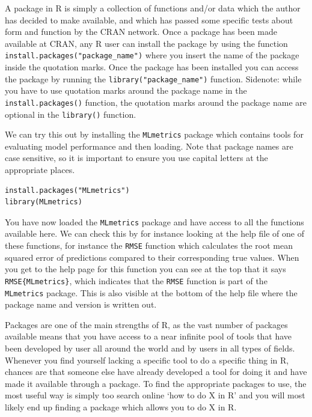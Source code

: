 \documentclass[
]{book}
\begin{document}
A package in R is simply a collection of functions and/or data which the author has decided to make available, and which has passed some specific tests about form and function by the CRAN network. Once a package has been made available at CRAN, any R user can install the package by using the function \texttt{install.packages("package\_name")} where you insert the name of the package inside the quotation marks. Once the package has been installed you can access the package by running the \texttt{library("package\_name")} function. Sidenote: while you have to use quotation marks around the package name in the \texttt{install.packages()} function, the quotation marks around the package name are optional in the \texttt{library()} function.

We can try this out by installing the \texttt{MLmetrics} package which contains tools for evaluating model performance and then loading. Note that package names are case sensitive, so it is important to ensure you use capital letters at the appropriate places.

\begin{verbatim}
install.packages("MLmetrics")
library(MLmetrics)
\end{verbatim}

You have now loaded the \texttt{MLmetrics} package and have access to all the functions available here. We can check this by for instance looking at the help file of one of these functions, for instance the \texttt{RMSE} function which calculates the root mean squared error of predictions compared to their corresponding true values. When you get to the help page for this function you can see at the top that it says \texttt{RMSE\{MLmetrics\}}, which indicates that the \texttt{RMSE} function is part of the \texttt{MLmetrics} package. This is also visible at the bottom of the help file where the package name and version is written out.

Packages are one of the main strengths of R, as the vast number of packages available means that you have access to a near infinite pool of tools that have been developed by user all around the world and by users in all types of fields. Whenever you find yourself lacking a specific tool to do a specific thing in R, chances are that someone else have already developed a tool for doing it and have made it available through a package. To find the appropriate packages to use, the most useful way is simply too search online `how to do X in R' and you will most likely end up finding a package which allows you to do X in R.
\end{document}
